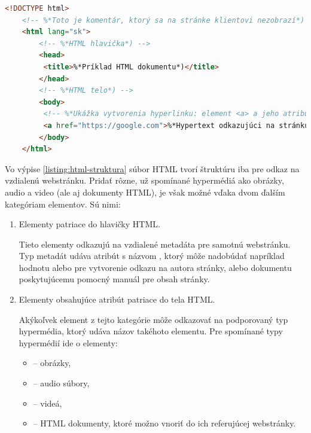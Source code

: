 \begin{center}
\centering
\begin{lstlisting}[caption={\centering Základná štruktúra HTML dokumentu. HTML obsahuje počiatočnú definíciu typu dokumentu (\code{<!DOCTYPE html>}), hlavičku, telo, hyperlink a popisné komentáre.},
label=listing:html-struktura, 
language=HTML, 
frame=tb,
xleftmargin=.05\textwidth, 
xrightmargin=.05\textwidth]
    <!DOCTYPE html>
    <!-- %*Toto je komentár, ktorý sa na stránke klientovi nezobrazí*) -->
    <html lang="sk">       
        <!-- %*HTML hlavička*) -->
        <head>
         <title>%*Príklad HTML dokumentu*)</title>
        </head>
        <!-- %*HTML telo*) -->
        <body>
         <!-- %*Ukážka vytvorenia hyperlinku: element <a> a jeho atribút href*) -->
         <a href="https://google.com">%*Hypertext odkazujúci na stránku google*)</a>
        </body>
    </html>
\end{lstlisting}
\end{center}

Vo výpise \ref{listing:html-struktura} súbor HTML tvorí štruktúru iba pre odkaz na vzdialenú webstránku.
Pridať rôzne, už spomínané hypermédiá ako obrázky, audio a video (ale aj dokumenty HTML), je však možné vďaka dvom ďalším kategóriam elementov. 
Sú nimi: 
\begin{enumerate}
    \item Elementy  patriace do hlavičky HTML.

    Tieto elementy odkazujú na vzdialené metadáta pre samotnú webstránku.
    Typ metadát udáva atribút s názvom , ktorý môže nadobúdať napríklad hodnotu 
     alebo  pre vytvorenie odkazu na autora stránky, alebo dokumentu poskytujúcemu 
    pomocný manuál pre obsah stránky.
    
    \item Elementy obsahujúce atribút  patriace do tela HTML.

    Akýkoľvek element z tejto kategórie môže odkazovať na podporovaný typ hypermédia, 
    ktorý udáva názov takéhoto elementu.
    Pre spomínané typy hypermédií ide o elementy: 
    \begin{itemize}
        \item {} -- obrázky,
        \item {} -- audio súbory,
        \item {} -- videá,
        \item {} -- HTML dokumenty, ktoré možno vnoriť do ich referujúcej webstránky.
    \end{itemize}
    
\end{enumerate}

